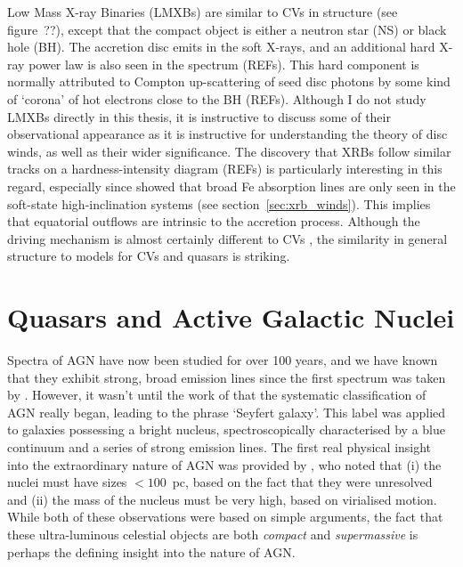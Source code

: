 Low Mass X-ray Binaries (LMXBs) 
are similar to CVs in structure (see figure~??), except that the compact object
is either a neutron star (NS) or black hole (BH). The accretion disc 
emits in the soft X-rays, and an additional hard X-ray power law is also 
seen in the spectrum (REFs). This hard component is normally attributed
to Compton up-scattering of seed disc photons by some kind of `corona'
of hot electrons close to the BH (REFs).
Although I do not study LMXBs directly in this thesis, it is instructive
to discuss some of their observational appearance as it is instructive 
for understanding the theory of disc winds, as well as their wider significance. 
The discovery that XRBs follow similar tracks on a hardness-intensity diagram (REFs)
is particularly interesting in this regard, especially since \cite{ponti2012}
showed that broad Fe absorption lines are only seen in the soft-state 
high-inclination systems (see section~\ref{sec:xrb_winds}). 
This implies that equatorial outflows are intrinsic to 
the accretion process. Although the driving mechanism
is almost certainly different to CVs \citep{diaztrigo2015}, 
the similarity in general structure 
to models for CVs and quasars is striking.




\section{Quasars and Active Galactic Nuclei}

Spectra of AGN have now been studied for over 100 years, and we have known 
that they exhibit strong, broad emission lines since the first spectrum was taken by
\cite{fath1909}.
However, it wasn't until the work of \cite{seyfert1943} that the systematic 
classification of AGN really began, leading to the phrase `Seyfert galaxy'.
This label was applied to galaxies possessing a bright nucleus, spectroscopically
characterised by a blue continuum and a series of strong emission lines.
The first real physical insight into the extraordinary nature of AGN
was provided by \cite{woltjer1959}, who noted that (i) the nuclei must have sizes $<100$~pc,
based on the fact that they were unresolved and (ii) the mass of the nucleus
must be very high, based on virialised motion. 
While both of these observations were based on simple arguments, the fact that these
ultra-luminous celestial objects are both {\em compact} and {\em supermassive}
is perhaps the defining insight into the nature of AGN.

